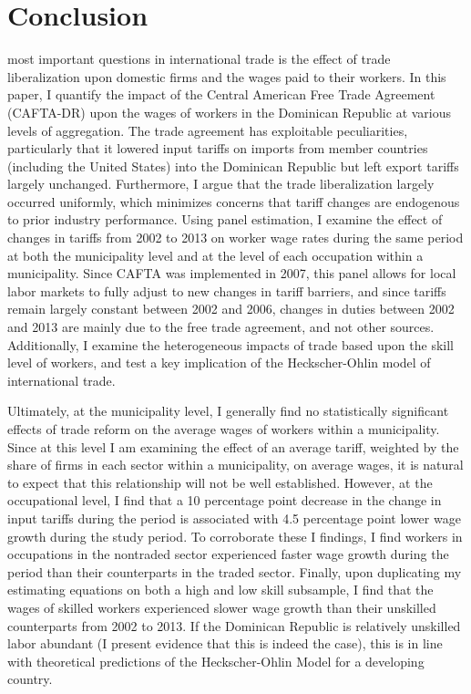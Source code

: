 \chapter{Conclusion}
\label{sec:Conclusion}

 most important questions in international trade is the effect of trade liberalization
upon domestic firms and the wages paid to their workers. In this paper, I quantify the impact of 
the Central American Free Trade Agreement (CAFTA-DR) upon the wages of workers in the Dominican 
Republic at various levels of aggregation. The trade agreement has exploitable peculiarities, 
particularly that it lowered input tariffs on imports from member countries (including the United States) 
into the Dominican Republic but left export tariffs largely unchanged. Furthermore, I argue that 
the trade liberalization largely occurred uniformly, which minimizes concerns that tariff changes
are endogenous to prior industry performance. Using panel estimation, I examine the effect
of changes in tariffs from 2002 to 2013 on worker wage rates during the same period at both the 
municipality level and at the level of each occupation within a municipality. 
Since CAFTA was implemented in 2007, this panel allows for local labor markets to fully adjust 
to new changes in tariff barriers, and since tariffs remain largely constant between 2002 and 2006, 
changes in duties between 2002 and 2013 are mainly due to the free trade agreement, and not other 
sources. Additionally, I examine the heterogeneous impacts of trade based upon the skill level of 
workers, and test a key implication of the Heckscher-Ohlin model of international trade. 

Ultimately, at the municipality level, I generally find no statistically significant effects of 
trade reform on the average wages of workers within a municipality. Since at this level I am examining
the effect of an average tariff, weighted by the share of firms in each sector within a municipality,
on average wages, it is natural to expect that this relationship will not be well established.
However, at the occupational level, I find that a 10 percentage point decrease in the change in input 
tariffs during the period is associated with 4.5 percentage point lower wage growth during the study 
period. To corroborate these I findings, I find workers in occupations in the nontraded sector experienced 
faster wage growth during the period than their counterparts in the traded sector. Finally, upon 
duplicating my estimating equations on both a high and low skill subsample, 
I find  that the wages of skilled workers experienced slower wage growth than their unskilled 
counterparts from 2002 to 2013. If the Dominican Republic is relatively unskilled labor
abundant (I present evidence that this is indeed the case), this is in line with theoretical predictions 
of the Heckscher-Ohlin Model for a developing country.

